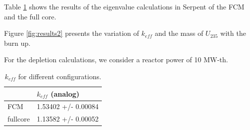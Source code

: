 \documentclass[11pt,letterpaper]{article}
\begin{document}
Table \ref{tab:results1} shows the results of the eigenvalue calculations in Serpent of the FCM and the full core.

Figure \ref{fig:results2} presents the variation of $k_{eff}$ and the mass of $U_{235}$ with the burn up.

For the depletion calculations, we consider a reactor power of 10 MW-th.

	\begin{table}[htbp!]
		\centering
	    \caption{$k_{eff}$ for different configurations.}
	    \label{tab:results1}
		\begin{tabular}{l|l}
		\hline
		             & $k_{eff}$ (analog)  \\ \hline
		FCM          & 1.53402 +/- 0.00084 \\ 
		fullcore     & 1.13582 +/- 0.00052 \\ \hline

		\end{tabular}
	\end{table}
\end{document}
